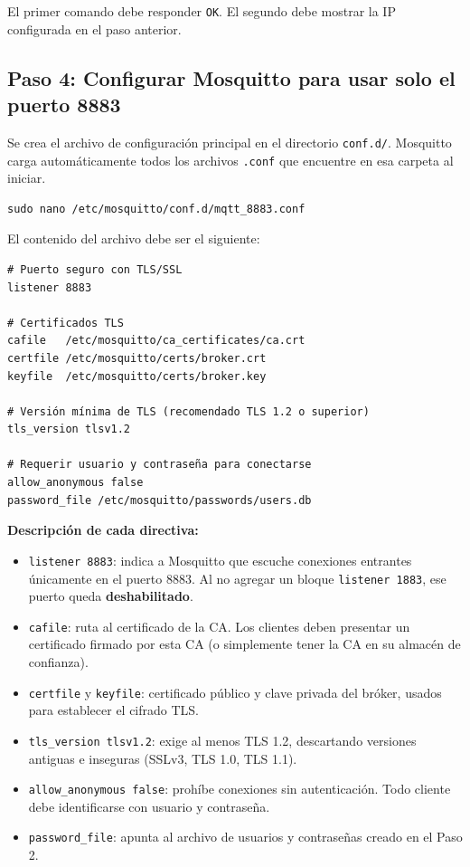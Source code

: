 \documentclass[12pt,a4paper]{article}
\begin{document}
El primer comando debe responder \texttt{OK}. El segundo debe mostrar la IP
configurada en el paso anterior.

\subsection{Paso 4: Configurar Mosquitto para usar solo el puerto 8883}

Se crea el archivo de configuración principal en el directorio
\texttt{conf.d/}. Mosquitto carga automáticamente todos los archivos
\texttt{.conf} que encuentre en esa carpeta al iniciar.

\begin{lstlisting}[style=bash]
sudo nano /etc/mosquitto/conf.d/mqtt_8883.conf
\end{lstlisting}

El contenido del archivo debe ser el siguiente:

\begin{lstlisting}[style=config]
# Puerto seguro con TLS/SSL
listener 8883

# Certificados TLS
cafile   /etc/mosquitto/ca_certificates/ca.crt
certfile /etc/mosquitto/certs/broker.crt
keyfile  /etc/mosquitto/certs/broker.key

# Versión mínima de TLS (recomendado TLS 1.2 o superior)
tls_version tlsv1.2

# Requerir usuario y contraseña para conectarse
allow_anonymous false
password_file /etc/mosquitto/passwords/users.db
\end{lstlisting}

\textbf{Descripción de cada directiva:}

\begin{itemize}
  \item \texttt{listener 8883}: indica a Mosquitto que escuche conexiones
    entrantes únicamente en el puerto 8883. Al no agregar un bloque
    \texttt{listener 1883}, ese puerto queda \textbf{deshabilitado}.
  \item \texttt{cafile}: ruta al certificado de la CA. Los clientes deben
    presentar un certificado firmado por esta CA (o simplemente tener la CA en
    su almacén de confianza).
  \item \texttt{certfile} y \texttt{keyfile}: certificado público y clave
    privada del bróker, usados para establecer el cifrado TLS.
  \item \texttt{tls\_version tlsv1.2}: exige al menos TLS 1.2, descartando
    versiones antiguas e inseguras (SSLv3, TLS 1.0, TLS 1.1).
  \item \texttt{allow\_anonymous false}: prohíbe conexiones sin autenticación.
    Todo cliente debe identificarse con usuario y contraseña.
  \item \texttt{password\_file}: apunta al archivo de usuarios y contraseñas
    creado en el Paso 2.
\end{itemize}
\end{document}

